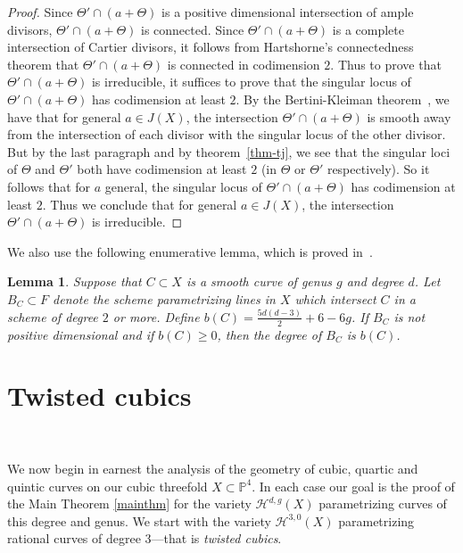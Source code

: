 \documentclass[amssymb,twoside,12 pt,amscd,reqno]{amsart}
\theoremstyle{plain}
\newtheorem{lem}[thm]{Lemma}
\theoremstyle{definition}
\newcommand{\Hdg}[2]{\mathcal{H}^{#1,#2}}
\def\P{{\mathbb P}}
\def\ps{\vspace{4pt}}
\begin{document}
\begin{proof}
Since
$\Theta'\cap(a+\Theta)$ is a positive dimensional intersection of
ample divisors,  
$\Theta'\cap(a+\Theta)$ is connected.
Since $\Theta'\cap(a+\Theta)$ is a
complete intersection of Cartier divisors, it follows from
Hartshorne's connectedness theorem \cite[thereom 18.12]{E} that
$\Theta'\cap(a+\Theta)$ is connected in codimension $2$.  Thus to
prove that $\Theta'\cap (a+\Theta)$ is irreducible, it suffices to
prove that the singular locus of $\Theta'\cap (a+\Theta)$ has
codimension at least $2$.
By the Bertini-Kleiman theorem~\cite[theorem III.10.8]{H}, we
have that for general $a\in J(X)$, the intersection $\Theta'\cap(a+\Theta)$
is smooth away from the intersection of each divisor with the singular 
locus of the other divisor.  But by the last paragraph and by
theorem~\ref{thm-tj}, we see that the singular loci of $\Theta$ and
$\Theta'$ both have codimension at least $2$ (in $\Theta$ or $\Theta'$ 
respectively).  So it follows that for $a$ general, the singular locus 
of $\Theta'\cap(a+\Theta)$ has codimension at least $2$.  Thus we
conclude that for general $a\in J(X)$, the intersection
$\Theta'\cap(a+\Theta)$ is irreducible.

\end{proof}

We also use the following enumerative lemma, which is proved
in~\cite[lemma 4.2]{HRS1}.  

\ps

\begin{lem}\label{lem-enum}  Suppose that $C\subset X$ is a smooth
curve of genus $g$ 
and degree $d$.  Let $B_C\subset F$ denote the scheme parametrizing
lines in $X$ which intersect $C$ in a scheme of degree $2$ or more.
Define $b(C)=\frac{5d(d-3)}{2}+6-6g$.  If
$B_C$ is not positive dimensional and if $b(C)\geq 0$, then the degree of
$B_C$ is $b(C)$.  
\end{lem}


\section{Twisted cubics}~\label{sec-30}

We  now begin in earnest the analysis of the geometry of cubic,
quartic and quintic curves on our cubic threefold 
$X \subset \P^4$. In each case our goal is the proof of the Main
Theorem \ref{mainthm} for the variety 
$\Hdg{d}{g}(X)$ parametrizing curves of this degree and genus. We
start with the variety $\Hdg{3}{0}(X)$ 
parametrizing rational curves of degree 3---that is \emph{twisted cubics}. 
\end{document}
